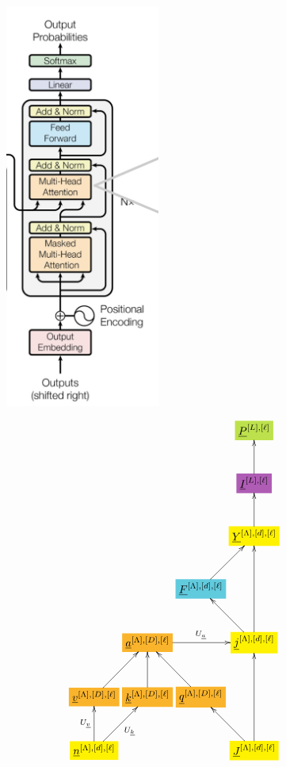 \documentclass[12pt]{article}
\begin{document}
\begin{figure}[h!]\centering
\begin{minipage}{.4\linewidth}
\includegraphics[width=2in]{decoder.jpg}
\end{minipage}%
\begin{minipage}{.6\linewidth}
$$\xymatrix@R=2.5pc@C=0.2pc{
&&&*+[F*:SpringGreen]{\underline{P}^{[L],[\ell]}}
\\
&&&*+[F*:Orchid]{\underline{I}^{[L],[\ell]}}\ar[u]
\\
&&&*+[F*:yellow]{\underline{Y}^{[\Lambda],[d], [\ell]}}\ar[u]
\\
&&*+[F*:SkyBlue]{\underline{F}^{[\Lambda],[d], [\ell]}}\ar[ur]&
\\
&*+[F*:Dandelion]{\underline{a}^{[\Lambda],[D],[\ell]}}\ar[rr]^{U_\rva}&&*+[F*:yellow]{\underline{j}^{[\Lambda],[d], [\ell]}}\ar[ul]\ar[uu]
\\
*+[F*:Dandelion]{\underline{v}^{[\Lambda],[D], [\ell]}}\ar[ur]&*+[F*:Dandelion]{\underline{k}^{[\Lambda],[D], [\ell]}}\ar[u]&*+[F*:Dandelion]{\underline{q}^{[\Lambda],[D], [\ell]}}\ar[ul]&
\\
*+[F*:yellow]{\underline{n}^{[\Lambda],[d], [\ell]}}\ar[ur]_{U_\rvk}\ar[u]^{U_\rvv}&&&*+[F*:yellow]{\underline{J}^{[\Lambda],[d], [\ell]}}\ar[uu]\ar[ul]
\\
}$$
\end{minipage}
\end{figure}
\end{document}
